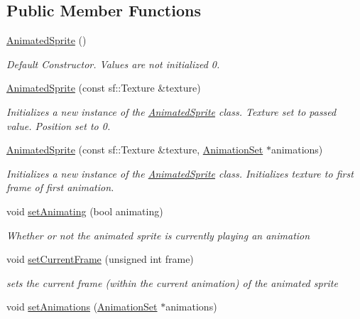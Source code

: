 \subsection*{Public Member Functions}
\begin{DoxyCompactItemize}
\item 
\hyperlink{class_animated_sprite_a1147eb833593fa4c28854b96a84413a9}{Animated\+Sprite} ()
\begin{DoxyCompactList}\small\item\em Default Constructor. Values are not initialized 0.\end{DoxyCompactList}\item 
\hyperlink{class_animated_sprite_af8e492c2897e3335ba96149085f4d165}{Animated\+Sprite} (const sf\+::\+Texture \&texture)
\begin{DoxyCompactList}\small\item\em Initializes a new instance of the \hyperlink{class_animated_sprite}{Animated\+Sprite} class. Texture set to passed value. Position set to 0. \end{DoxyCompactList}\item 
\hyperlink{class_animated_sprite_ac17be6b9808193a6bcbdccd92b61e60e}{Animated\+Sprite} (const sf\+::\+Texture \&texture, \hyperlink{class_animation_set}{Animation\+Set} $\ast$animations)
\begin{DoxyCompactList}\small\item\em Initializes a new instance of the \hyperlink{class_animated_sprite}{Animated\+Sprite} class. Initializes texture to first frame of first animation. \end{DoxyCompactList}\item 
void \hyperlink{class_animated_sprite_ab73cac59a5415b0f08eb3963543d9bc8}{set\+Animating} (bool animating)
\begin{DoxyCompactList}\small\item\em Whether or not the animated sprite is currently playing an animation\end{DoxyCompactList}\item 
void \hyperlink{class_animated_sprite_a8ad3a9bac853b0b55fb3efd96c93a2d5}{set\+Current\+Frame} (unsigned int frame)
\begin{DoxyCompactList}\small\item\em sets the current frame (within the current animation) of the animated sprite \end{DoxyCompactList}\item 
void \hyperlink{class_animated_sprite_ab3a1384d836bc7f9b8580dccf33c2f1c}{set\+Animations} (\hyperlink{class_animation_set}{Animation\+Set} $\ast$animations)

\end{DoxyCompactItemize}
